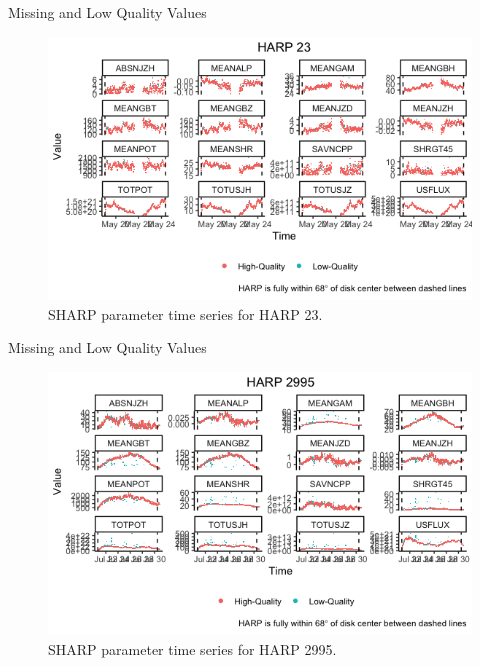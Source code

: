 \documentclass{beamer}
\begin{document}
\begin{frame}{Missing and Low Quality Values}
    \begin{figure}[!htb]
        \centering
        \includegraphics[scale=0.5]{harp23.png}
        \caption{SHARP parameter time series for HARP 23.}
        \label{fig:na_props_flux}
    \end{figure}
\end{frame}

\begin{frame}{Missing and Low Quality Values}
    \begin{figure}[!htb]
        \centering
        \includegraphics[scale=0.5]{harp2995.png}
        \caption{SHARP parameter time series for HARP 2995.}
        \label{fig:na_props_flux}
    \end{figure}
\end{frame}

\end{document}
